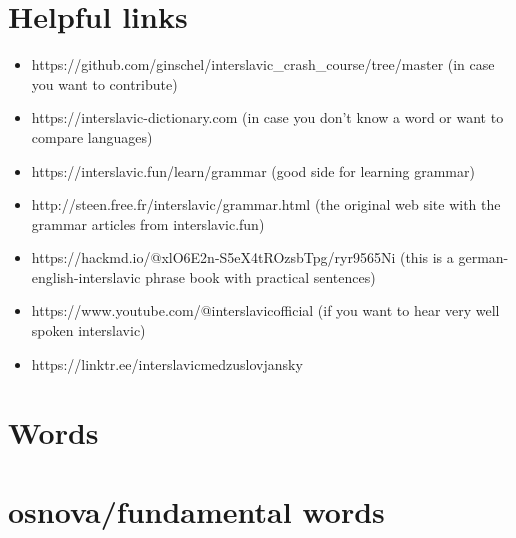 \documentclass{article}
\begin{document}
\section{Helpful links}
\begin{itemize}
    \item https://github.com/ginschel/interslavic\_crash\_course/tree/master (in case you want to contribute)
    \item https://interslavic-dictionary.com (in case you don't know a word or want to compare languages)
    \item https://interslavic.fun/learn/grammar (good side for learning grammar)
    \item http://steen.free.fr/interslavic/grammar.html (the original web site with the grammar articles from interslavic.fun)
    \item https://hackmd.io/@xlO6E2n-S5eX4tROzsbTpg/ryr9565Ni (this is a german-english-interslavic phrase book with practical sentences)
    \item https://www.youtube.com/@interslavicofficial (if you want to hear very well spoken interslavic)
    \item https://linktr.ee/interslavicmedzuslovjansky
\end{itemize}
\newpage
\section{Words}
\section*{osnova/fundamental words}
\end{document}
